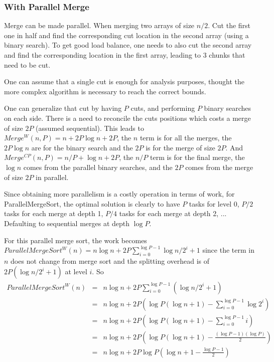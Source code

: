 \documentclass{article}
\begin{document}
\subsubsection{With Parallel Merge}

Merge can be made parallel. When merging two arrays of size $n/2$. Cut
the first one in half and find the corresponding cut location in the
second array (using a binary search). To get good load balance, one
needs to also cut the second array and find the corresponding location
in the first array, leading to 3 chunks that need to be cut.

One can assume that a single cut is enough for analysis purposes,
thought the more complex algorithm is necessary to reach the correct
bounds.

One can generalize that cut by having $P$ cuts, and performing $P$
binary searches on each side. There is a need to reconcile the cuts
positions which costs a merge of size $2P$ (assumed sequential). This
leads to $Merge^W(n,P) = n + 2 P \log n + 2P$, the $n$ term is for all
the merges, the $2P \log n$ are for the binary search and the $2P$ is
for the merge of size $2P$. And $Merge^{CP}(n,P) = n/P + \log n + 2P$,
the $n/P$ term is for the final merge, the $\log n$ comes from the
parallel binary searches, and the $2P$ comes from the merge of size
$2P$ in parallel.

Since obtaining more parallelism is a costly operation in terms of
work, for ParallelMergeSort, the optimal solution is clearly to have
$P$ tasks for level 0, $P/2$ tasks for each merge at depth 1,
$P/4$ tasks for each merge at depth 2, ... Defaulting to sequential
merges at depth $\log P$.

For this parallel merge sort, the work becomes
$ParallelMergeSort^W(n) = n \log n + 2 P \sum_{i=0}^{\log P - 1} \log n/2^i + 1$
since the term in $n$ does not change
from merge sort and the splitting overhead is of $2P (\log n/2^i + 1)$ at
level $i$. So
\begin{align}
  ParallelMergeSort^W(n) & = & n \log n + 2 P \sum_{i=0}^{\log P - 1}( \log n/2^i + 1  )\\
  & = &n \log n + 2 P \left (\log P (\log n +1)- \sum_{i=0}^{\log P - 1} \log 2^i  \right )  \\
  & = &n \log n + 2 P \left (\log P (\log n +1)- \sum_{i=0}^{\log P - 1} i \right )  \\
  & = &n \log n + 2 P \left ( \log P (\log n +1)- \frac{(\log P - 1)(\log P)}{2}   \right) \\
  & = &n \log n + 2 P \log P \left (  \log n + 1 - \frac{\log P - 1}{2}   \right)  
\end{align}
\end{document}

